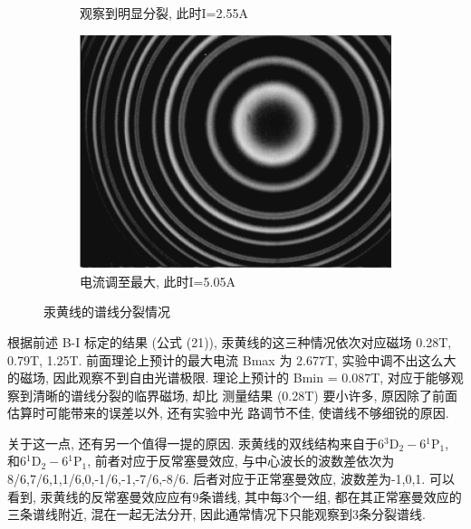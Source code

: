\documentclass[12pt,a4paper]{article}
\begin{document}
\begin{figure}[H]
\begin{subfigure}[b]{0.3\textwidth}
      \caption{观察到明显分裂, 此时I=2.55A}
    \end{subfigure}
    \hfill
    \begin{subfigure}[b]{0.3\textwidth}
      \centering
      \includegraphics[width=\textwidth]{4.68yy.png}
      \caption{电流调至最大, 此时I=5.05A}
    \end{subfigure}
    \caption{汞黄线的谱线分裂情况}
  \end{figure}
  根据前述 B-I 标定的结果 (公式 (21)), 汞黄线的这三种情况依次对应磁场 0.28T,
  0.79T, 1.25T. 前面理论上预计的最大电流 Bmax 为 2.677T, 实验中调不出这么大的磁场, 因此观察不到自由光谱极限. 
  理论上预计的 Bmin = 0.087T, 对应于能够观察到清晰的谱线分裂的临界磁场, 却比
  测量结果 (0.28T) 要小许多, 原因除了前面估算时可能带来的误差以外, 还有实验中光
  路调节不佳, 使谱线不够细锐的原因. 
  
  关于这一点, 还有另一个值得一提的原因. 汞黄线的双线结构来自于$6{ }^{3} \mathrm{D}_{2}-6{ }^{1} \mathrm{P}_{1}$, 和$6{ }^{1} \mathrm{D}_{2}-6{ }^{1} \mathrm{P}_{1}$, 
  前者对应于反常塞曼效应, 与中心波长的波数差依次为8/6,7/6,1,1/6,0,-1/6,-1,-7/6,-8/6. 后者对应于正常塞曼效应, 波数差为-1,0,1. 可以看到, 汞黄线的反常塞曼效应应有9条谱线, 其中每3个一组, 都在其正常塞曼效应的三条谱线附近, 混在一起无法分开, 
  因此通常情况下只能观察到3条分裂谱线. 
  
\end{document}
